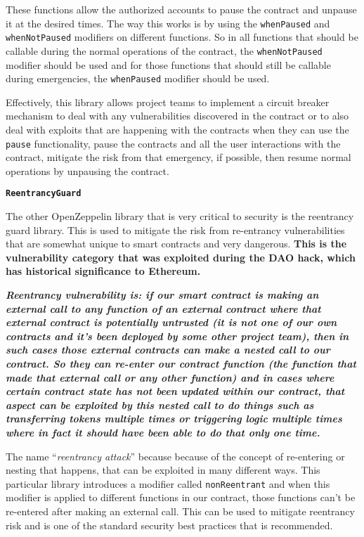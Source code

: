 These functions allow the authorized accounts to pause the contract and
unpause it at the desired times. The way this works is by using the
\texttt{whenPaused} and \texttt{whenNotPaused} modifiers on different
functions. So in all functions that should be callable during the normal
operations of the contract, the \texttt{whenNotPaused} modifier should
be used and for those functions that should still be callable during
emergencies, the \texttt{whenPaused} modifier should be used.

Effectively, this library allows project teams to implement a circuit
breaker mechanism to deal with any vulnerabilities discovered in the
contract or to also deal with exploits that are happening with the
contracts when they can use the \texttt{pause} functionality, pause the
contracts and all the user interactions with the contract, mitigate the
risk from that emergency, if possible, then resume normal operations by
unpausing the contract.

\textbf{\texttt{ReentrancyGuard}}

The other OpenZeppelin library that is very critical to security is the
reentrancy guard library. This is used to mitigate the risk from
re-entrancy vulnerabilities that are somewhat unique to smart contracts
and very dangerous. \textbf{This is the vulnerability category that was
exploited during the DAO hack, which has historical significance to
Ethereum.}

\emph{\textbf{Reentrancy vulnerability is: if our smart contract is
making an external call to any function of an external contract where
that external contract is potentially untrusted (it is not one of our
own contracts and it's been deployed by some other project team), then
in such cases those external contracts can make a nested call to our
contract. So they can re-enter our contract function (the function that
made that external call or any other function) and in cases where
certain contract state has not been updated within our contract, that
aspect can be exploited by this nested call to do things such as
transferring tokens multiple times or triggering logic multiple times
where in fact it should have been able to do that only one time.}}

The name ``\emph{reentrancy attack}'' because because of the concept of
re-entering or nesting that happens, that can be exploited in many
different ways. This particular library introduces a modifier called
\texttt{nonReentrant} and when this modifier is applied to different
functions in our contract, those functions can't be re-entered after
making an external call. This can be used to mitigate reentrancy risk
and is one of the standard security best practices that is recommended.

